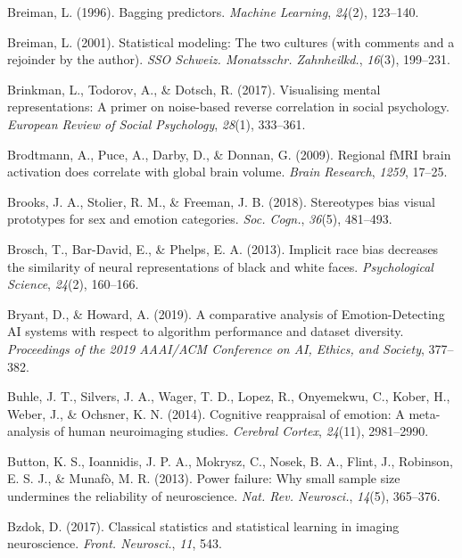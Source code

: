 \documentclass[11pt,american,a4paper,oneside,]{memoir} %
\begin{document}
\leavevmode\hypertarget{ref-breiman1996bagging}{}%
Breiman, L. (1996). Bagging predictors. \emph{Machine Learning}, \emph{24}(2), 123--140.

\leavevmode\hypertarget{ref-Breiman2001-lf}{}%
Breiman, L. (2001). Statistical modeling: The two cultures (with comments and a rejoinder by the author). \emph{SSO Schweiz. Monatsschr. Zahnheilkd.}, \emph{16}(3), 199--231.

\leavevmode\hypertarget{ref-Brinkman2017-hg}{}%
Brinkman, L., Todorov, A., \& Dotsch, R. (2017). Visualising mental representations: A primer on noise-based reverse correlation in social psychology. \emph{European Review of Social Psychology}, \emph{28}(1), 333--361.

\leavevmode\hypertarget{ref-brodtmann2009regional}{}%
Brodtmann, A., Puce, A., Darby, D., \& Donnan, G. (2009). Regional fMRI brain activation does correlate with global brain volume. \emph{Brain Research}, \emph{1259}, 17--25.

\leavevmode\hypertarget{ref-Brooks2018-ao}{}%
Brooks, J. A., Stolier, R. M., \& Freeman, J. B. (2018). Stereotypes bias visual prototypes for sex and emotion categories. \emph{Soc. Cogn.}, \emph{36}(5), 481--493.

\leavevmode\hypertarget{ref-brosch2013implicit}{}%
Brosch, T., Bar-David, E., \& Phelps, E. A. (2013). Implicit race bias decreases the similarity of neural representations of black and white faces. \emph{Psychological Science}, \emph{24}(2), 160--166.

\leavevmode\hypertarget{ref-Bryant2019-sg}{}%
Bryant, D., \& Howard, A. (2019). A comparative analysis of Emotion-Detecting AI systems with respect to algorithm performance and dataset diversity. \emph{Proceedings of the 2019 AAAI/ACM Conference on AI, Ethics, and Society}, 377--382.

\leavevmode\hypertarget{ref-buhle2014cognitive}{}%
Buhle, J. T., Silvers, J. A., Wager, T. D., Lopez, R., Onyemekwu, C., Kober, H., Weber, J., \& Ochsner, K. N. (2014). Cognitive reappraisal of emotion: A meta-analysis of human neuroimaging studies. \emph{Cerebral Cortex}, \emph{24}(11), 2981--2990.

\leavevmode\hypertarget{ref-Button2013-zu}{}%
Button, K. S., Ioannidis, J. P. A., Mokrysz, C., Nosek, B. A., Flint, J., Robinson, E. S. J., \& Munafò, M. R. (2013). Power failure: Why small sample size undermines the reliability of neuroscience. \emph{Nat. Rev. Neurosci.}, \emph{14}(5), 365--376.

\leavevmode\hypertarget{ref-Bzdok2017-li}{}%
Bzdok, D. (2017). Classical statistics and statistical learning in imaging neuroscience. \emph{Front. Neurosci.}, \emph{11}, 543.
\end{document}
